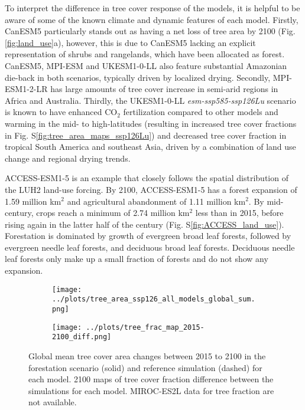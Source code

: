 \documentclass[]{article}
\begin{document}
To interpret the difference in tree cover response of the models, it is helpful to be aware of some of the known climate and dynamic features of each model.
Firstly, CanESM5 particularly stands out as having a net loss of tree area by 2100 (Fig. \ref{fig:land_use}a), however, this is due to CanESM5 lacking an explicit representation of shrubs and rangelands, which have been allocated as forest.
CanESM5, MPI-ESM and UKESM1-0-LL also feature substantial Amazonian die-back in both scenarios, typically driven by localized drying.
Secondly, MPI-ESM1-2-LR has large amounts of tree cover increase in semi-arid regions in Africa and Australia.
Thirdly, the UKESM1-0-LL \textit{esm-ssp585-ssp126Lu} scenario is known to have enhanced CO$_2$ fertilization compared to other models and warming in the mid- to high-latitudes (resulting in increased tree cover fractions in Fig. S\ref{fig:tree_area_maps_ssp126Lu}) and decreased tree cover fraction in tropical South America and southeast Asia, driven by a combination of land use change and regional drying trends.

ACCESS-ESM1-5 is an example that closely follows the spatial distribution of the LUH2 land-use forcing.
By 2100, ACCESS-ESM1-5 has a forest expansion of 1.59 million km$^2$ and agricultural abandonment of 1.11 million km$^2$.
By mid-century, crops reach a minimum of 2.74 million km$^2$ less than in 2015, before rising again in the latter half of the century (Fig. S\ref{fig:ACCESS_land_use}).
Forestation is dominated by growth of evergreen broad leaf forests, followed by evergreen needle leaf forests, and deciduous broad leaf forests.
Deciduous needle leaf forests only make up a small fraction of forests and do not show any expansion.

\begin{figure}[H]
    \centering
    \begin{subfigure}[b]{0.8\linewidth}
        \texttt{[image: ../plots/tree\_area\_ssp126\_all\_models\_global\_sum.png]}
    \end{subfigure}
    \begin{subfigure}[b]{0.8\linewidth}
        \texttt{[image: ../plots/tree\_frac\_map\_2015-2100\_diff.png]}
    \end{subfigure}
    \caption{Global mean tree cover area changes between 2015 to 2100 in the forestation scenario (solid) and reference simulation (dashed) for each model. 2100 maps of tree cover fraction difference between the simulations for each model. MIROC-ES2L data for tree fraction are not available.}
    \label{fig:land_use_map}
\end{figure}
\end{document}
